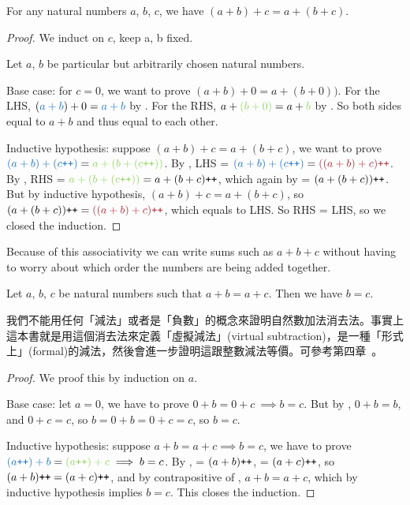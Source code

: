 \begin{proposition}\label{prop 2.2.5} For any natural numbers \(a\), \(b\), \(c\), we have \((a + b) + c = a + (b + c)\).
\end{proposition}
\begin{proof}
We induct on \(c\), keep a, b fixed.

Let \(a\), \(b\) be particular but arbitrarily chosen natural numbers.

Base case: for \(c = 0\), we want to prove \((a + b) + 0 = a + (b + 0))\). For the LHS, \((\BLUE{a + b}) + 0 = \BLUE{a + b}\) by . For the RHS, \(a + \GREEN{(b + 0)} = a + \GREEN{b}\) by . So both sides equal to \(a + b\) and thus equal to each other.

Inductive hypothesis: suppose \((a + b) + c = a + (b + c)\), we want to prove \(\BLUE{(a + b) + (c\INC)} = \GREEN{a + (b + (c\INC))}\). By , LHS = \(\BLUE{(a + b) + (c\INC)} = \MAROON{((a + b) + c)\INC}\). By , RHS = \(\GREEN{a + (b + (c\INC))} = a + (b + c)\INC\), which again by  = \((a + (b + c))\texttt{++}\). But by inductive hypothesis, \((a + b) + c = a + (b + c)\), so \((a + (b + c))\INC = \MAROON{((a + b) + c)\INC}\), which equals to LHS. So RHS = LHS, so we closed the induction.
\end{proof}

\begin{note}
Because of this associativity we can write sums such as \(a + b + c\) without having to worry about which order the numbers are being added together.
\end{note}

\begin{proposition}\label{prop 2.2.6} Let \(a\), \(b\), \(c\) be natural numbers such that \(a + b = a + c\). Then we have \(b = c\).
\end{proposition}
\begin{note}
我們不能用任何「減法」或者是「負數」的概念來證明自然數加法消去法。事實上這本書就是用這個消去法來定義「虛擬減法」(virtual subtraction)，是一種「形式上」(formal)的減法，然後會進一步證明這跟整數減法等價。可參考第四章\ 。
\end{note}
\begin{proof}
We proof this by induction on \(a\).

Base case: let \(a = 0\), we have to prove \(0 + b = 0 + c\ \implies b = c\). But by , \(0 + b = b\), and \(0 + c = c\), so \(b = 0 + b = 0 + c = c\), so \(b = c\).

Inductive hypothesis: suppose \(a + b = a + c \implies b = c\), we have to prove \(\BLUE{(a\INC) + b} = \GREEN{(a\INC) + c} \implies b = c\). By ,  = \((a + b)\texttt{++}\),  = \((a + c)\texttt{++}\), so \((a + b)\texttt{++} = (a + c)\texttt{++}\), and by contrapositive of , \(a + b = a + c\), which by inductive hypothesis implies \(b = c\). This closes the induction.
\end{proof}

